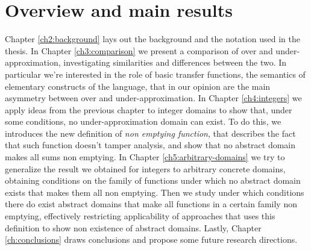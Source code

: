 \section{Overview and main results}
Chapter \ref{ch2:background} lays out the background and the notation used in the thesis.
In Chapter \ref{ch3:comparison} we present a comparison of over and under-approximation, investigating similarities and differences between the two. In particular we're interested in the role of basic transfer functions, the semantics of elementary constructs of the language, that in our opinion are the main asymmetry between over and under-approximation.
In Chapter \ref{ch4:integers} we apply ideas from the previous chapter to integer domains to show that, under some conditions, no under-approximation domain can exist. To do this, we introduces the new definition of \emph{non emptying function}, that describes the fact that such function doesn't tamper analysis, and show that no abstract domain makes all sums non emptying.
In Chapter \ref{ch5:arbitrary-domains} we try to generalize the result we obtained for integers to arbitrary concrete domains, obtaining conditions on the family of functions under which no abstract domain exists that makes them all non emptying. Then we study under which conditions there do exist abstract domains that make all functions in a certain family non emptying, effectively restricting applicability of approaches that uses this definition to show non existence of abstract domains.
Lastly, Chapter \ref{ch:conclusions} draws conclusions and propose some future research directions.
